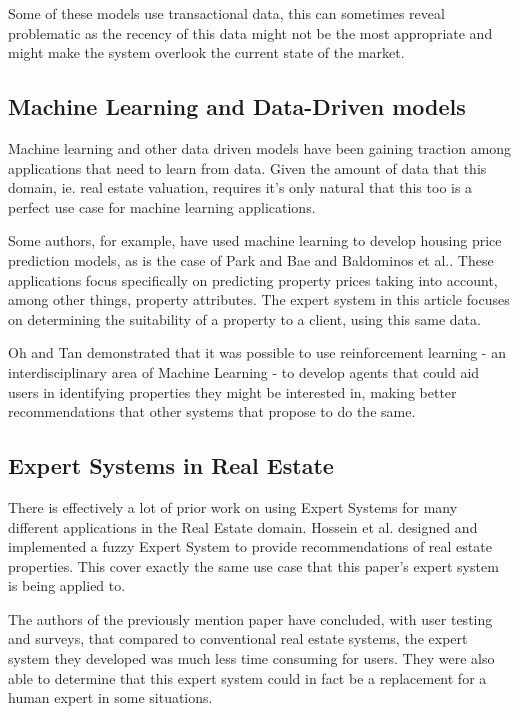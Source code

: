 \documentclass[runningheads]{llncs}
\begin{document}
Some of these models use transactional data, this can sometimes reveal problematic as the recency of this data might not be the most appropriate and might make the system overlook the current state of the market.

\subsection{Machine Learning and Data-Driven models}

Machine learning and other data driven models have been gaining traction among applications that need to learn from data. 
Given the amount of data that this domain, ie. real estate valuation, requires it's only natural that this too is a perfect use case for machine learning applications.

Some authors, for example, have used machine learning to develop housing price prediction models, as is the case of Park and Bae\cite{bpark} and Baldominos et al.\cite{mlinrealestate}. These applications focus specifically on predicting property prices taking into account, among other things, property attributes. The expert system in this article focuses on determining the suitability of a property to a client, using this same data.

Oh and Tan\cite{reinforcement} demonstrated that it was possible to use reinforcement learning - an interdisciplinary area of Machine Learning - to develop agents that could aid users in identifying properties they might be interested in, making better recommendations that other systems that propose to do the same.

\subsection{Expert Systems in Real Estate}

There is effectively a lot of prior work on using Expert Systems for many different applications in the Real Estate domain. Hossein et al.\cite{hossein} designed and implemented a fuzzy Expert System to provide recommendations of real estate properties. This cover exactly the same use case that this paper's expert system is being applied to. 

The authors of the previously mention paper have concluded, with user testing and surveys, that compared to conventional real estate systems, the expert system they developed was much less time consuming for users. They were also able to determine that this expert system could in fact be a replacement for a human expert in some situations.
\end{document}

